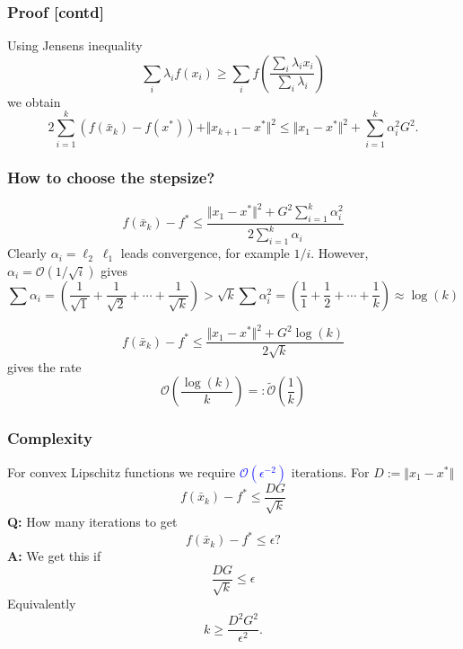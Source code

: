 \documentclass{beamer}
\begin{document}
\begin{frame}
  \frametitle{Proof [contd]}
  Using Jensens inequality %
  \begin{equation}
    \sum_{i} \lambda_i f(x_i) \ge \sum_{i} f \left( \frac{\sum_{i} \lambda_i x_i}{\sum_{i}\lambda_i} \right)
  \end{equation}
  we obtain
  \begin{equation}
    2\sum_{i=1}^{k}  (f(\bar{x}_k) - f(x^*)) + \Vert x_{k+1} - x^* \Vert^2 \le \Vert x_1-x^* \Vert^2 +  \sum_{i=1}^{k} \alpha_i^2 G^2.
  \end{equation}

\end{frame}

\begin{frame}
  \frametitle{How to choose the stepsize?}
  \begin{equation}
    f(\bar{x}_k) - f^* \le \frac{\Vert x_1-x^*\Vert^2 + G^2 \sum_{i=1}^{k}\alpha_i^2}{2 \sum_{i=1}^{k}\alpha_i}
  \end{equation}
  Clearly $\alpha_i = \ell_2\ \ell_1$ leads convergence, for example $1/i$.
  However, $\alpha_i = \mathcal{O}(1/\sqrt{i})$ gives
  \begin{equation}
    \sum \alpha_i = (\frac{1}{\sqrt{1}} + \frac{1}{\sqrt{2}} + \cdots +  \frac{1}{\sqrt{k}}) > \sqrt{k}
    \sum \alpha_i^2 = (\frac{1}{1} + \frac{1}{2} + \cdots + \frac{1}{k}) \approx \log(k)
  \end{equation}

  \begin{equation}
    f(\bar{x}_k) - f^* \le \frac{\Vert x_1-x^*\Vert^2 + G^2 \log(k)}{2 \sqrt{k}}
  \end{equation}
  gives the rate
  \begin{equation}
    \mathcal{O}\left(\frac{\log(k)}{k}\right) =: \tilde{\mathcal{O}}\left(\frac{1}{k}\right)
  \end{equation}
\end{frame}

\begin{frame}
  \frametitle{Complexity}
  For convex Lipschitz functions we require \textcolor{blue}{$\mathcal{O}(\epsilon^{-2})$} iterations. For $D:= \Vert x_1 -x^* \Vert$
  \begin{equation}
    f(\bar{x}_k) - f^* \le \frac{D G}{\sqrt{k}}
  \end{equation}
  \textbf{Q:} How many iterations to get
  \begin{equation}
    f(\bar{x}_k) - f^* \le \epsilon ?
  \end{equation}
  \textbf{A:} We get this if
  \begin{equation}
    \frac{D G}{\sqrt{k}} \le \epsilon
  \end{equation}
  Equivalently
  \begin{equation}
    k \ge \frac{D^2 G^2}{\epsilon^2}.
  \end{equation}
\end{frame}
\end{document}
